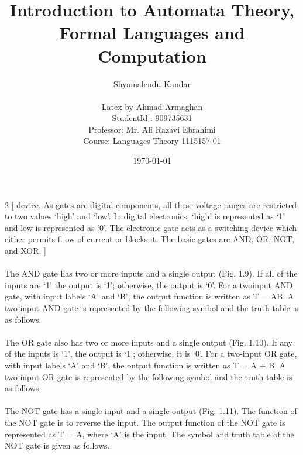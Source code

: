 \documentclass[10.5pt]{article}
\title{Introduction to Automata Theory,\\Formal Languages and\\Computation}
\author{Shyamalendu Kandar\\\\Latex by Ahmad Armaghan\\StudentId : 909735631\\Professor: Mr. Ali Razavi Ebrahimi\\Course: Languages Theory 1115157-01}
\date{\today}
\begin{document}
\maketitle
\clearpage
\begin{multicols}{2}
[
\noindent device. As gates are digital components, all these voltage ranges are restricted to two values ‘high’ and
‘low’. In digital electronics, ‘high’ is represented as ‘1’ and low is represented as ‘0’. The electronic gate
acts as a switching device which either permits fl ow of current or blocks it. The basic gates are AND,
OR, NOT, and XOR.
]
\paragraph{}
The AND gate has two or more inputs and a single
output (Fig. 1.9). If all of the inputs are ‘1’ the
output is ‘1’; otherwise, the output is ‘0’. For a twoinput
AND gate, with input labels ‘A’ and ‘B’, the
output function is written as T = AB. A two-input
AND gate is represented by the following symbol
and the truth table is as follows.
\paragraph{}
The OR gate also has two or more inputs and a
single output (Fig. 1.10). If any of the inputs is ‘1’,
the output is ‘1’; otherwise, it is ‘0’. For a two-input
OR gate, with input labels ‘A’ and ‘B’, the output
function is written as T = A + B. A two-input OR
gate is represented by the following symbol and the
truth table is as follows.
\paragraph{}
The NOT gate has a single input and a single
output (Fig. 1.11). The function of the NOT gate is
to reverse the input. The output function of the NOT
gate is represented as T = A, where ‘A’ is the input.
The symbol and truth table of the NOT gate is given
as follows.

\end{multicols}
\end{document}
